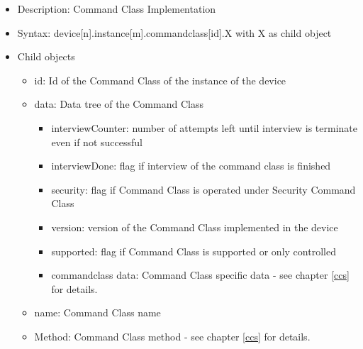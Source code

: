 \begin {itemize}
\item Description: Command Class Implementation
\item Syntax:  device[n].instance[m].commandclass[id].X with  X as child object
\item Child objects
\begin {itemize}
\item id: Id of the Command Class of the instance of the device
\item data: Data tree of the Command Class
\begin {itemize}
\item interviewCounter: number of attempts left until interview is terminate even if not successful
\item interviewDone: flag if interview of the command class is finished
\item security: flag if Command Class is operated under Security Command Class
\item version: version of the Command Class implemented in the device
\item supported: flag if Command Class is supported or only controlled
\item {commandclass data}: Command Class specific data - see chapter \ref{ccs} for details.
\end {itemize}
\item name: Command Class name
\item {Method}: Command Class method - see chapter \ref{ccs} for details.
\end {itemize}
\end {itemize}


 
